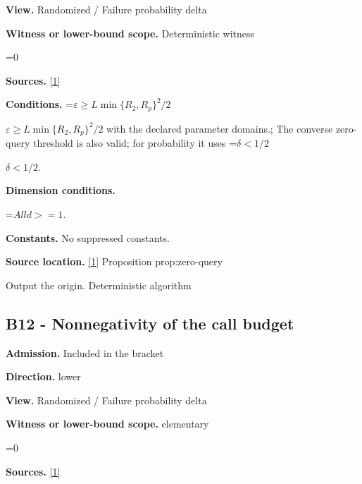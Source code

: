 \documentclass[10pt,a4paper]{article}
\newcommand{\AtlasMath}[1]{\par\begingroup\centering\setbox0=\hbox{$\displaystyle #1$}\ifdim\wd0>1.4\linewidth\typeout{ATLAS WIDE FORMULA: \the\wd0}\fi\ifdim\wd0>\linewidth\resizebox{\linewidth}{!}{\box0}\else\box0\fi\par\endgroup}
\newcommand{\AtlasInlineMath}[1]{\begingroup\setbox0=\hbox{$#1$}\ifdim\wd0>.4\linewidth\endgroup\AtlasMath{#1}\else\endgroup$#1$\fi}
\begin{document}
\textbf{View.} Randomized / Failure probability delta



\textbf{Witness or lower-bound scope.} Deterministic witness



\AtlasMath{0}


\textbf{Sources.} \href{https://github.com/WU-Wendao/Colombo/blob/main/colombo_sensorium/Complexity_altas/data/sources/colombo/U02/manuscript.pdf}{[1]}



\textbf{Conditions.} \AtlasInlineMath{\varepsilon\ge L\min\{R_2,R_p\}^2/2} with the declared parameter domains.; The converse zero-query threshold is also valid; for probability it uses \AtlasInlineMath{\delta<1/2}.



\textbf{Dimension conditions.}



\AtlasMath{All d>=1.}


\textbf{Constants.} No suppressed constants.



\textbf{Source location.} \href{https://github.com/WU-Wendao/Colombo/blob/main/colombo_sensorium/Complexity_altas/data/sources/colombo/U02/manuscript.pdf}{[1]} Proposition prop:zero-query



Output the origin. Deterministic algorithm



\subsection{B12 - Nonnegativity of the call budget}


\textbf{Admission.} Included in the bracket



\textbf{Direction.} lower



\textbf{View.} Randomized / Failure probability delta



\textbf{Witness or lower-bound scope.} elementary



\AtlasMath{0}


\textbf{Sources.} \href{https://github.com/WU-Wendao/Colombo/blob/main/colombo_sensorium/Complexity_altas/data/sources/colombo/U02/manuscript.pdf}{[1]}
\end{document}
